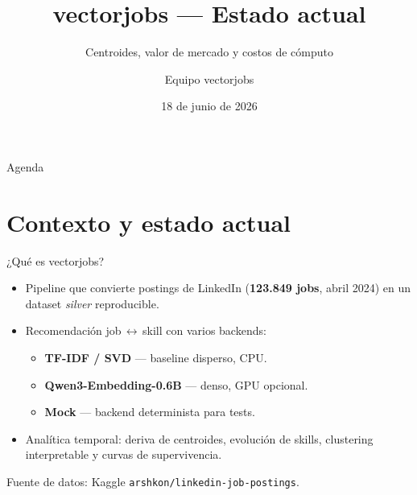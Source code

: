 \documentclass[aspectratio=169]{beamer}
\title[vectorjobs]{vectorjobs --- Estado actual}
\subtitle{Centroides, valor de mercado y costos de cómputo}
\author{Equipo vectorjobs}
\institute{Pipeline de recomendación job\,$\leftrightarrow$\,skill}
\date{18 de junio de 2026}
\begin{document}
\begin{frame}
  \titlepage
\end{frame}

\begin{frame}{Agenda}
  \tableofcontents
\end{frame}

\section{Contexto y estado actual}

\begin{frame}{¿Qué es vectorjobs?}
  \begin{itemize}
    \item Pipeline que convierte postings de LinkedIn (\textbf{123.849 jobs},
          abril 2024) en un dataset \emph{silver} reproducible.
    \item Recomendación job\,$\leftrightarrow$\,skill con varios backends:
      \begin{itemize}
        \item \textbf{TF-IDF / SVD} --- baseline disperso, CPU.
        \item \textbf{Qwen3-Embedding-0.6B} --- denso, GPU opcional.
        \item \textbf{Mock} --- backend determinista para tests.
      \end{itemize}
    \item Analítica temporal: deriva de centroides, evolución de skills,
          clustering interpretable y curvas de supervivencia.
  \end{itemize}
  \vfill
  \footnotesize Fuente de datos: Kaggle \texttt{arshkon/linkedin-job-postings}.
\end{frame}
\end{document}
